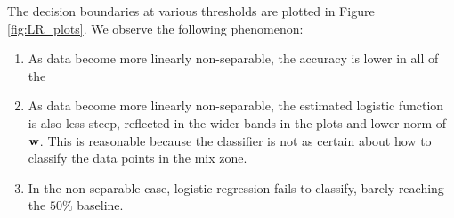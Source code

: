 The decision boundaries at various thresholds are plotted in Figure \ref{fig:LR_plots}. We observe the following phenomenon:
\begin{enumerate}
\item As data become more linearly non-separable, the accuracy is lower in all of the 
\item As data become more linearly non-separable, the estimated logistic function is also less steep, reflected in the wider bands in the plots and lower norm of $\boldsymbol{\mathbf{w}}$. This is reasonable because the classifier is not as certain about how to classify the data points in the mix zone.
\item In the non-separable case, logistic regression fails to classify, barely reaching the $50\%$ baseline.
\end{enumerate}


